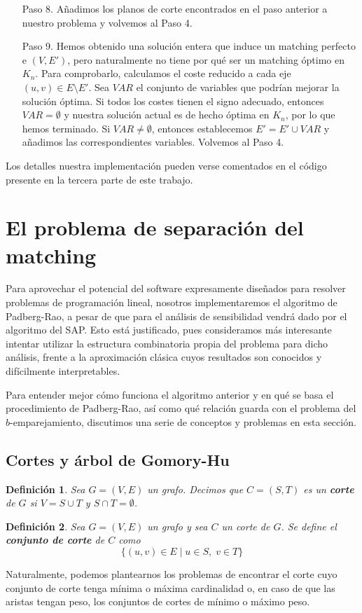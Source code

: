 \documentclass[twoside,a4paper,openright,12pt,tikz]{book}
\newtheorem{defi}{Definici\'on}[section]
\begin{document}
\begin{itemize}
\item[Paso 8.] Añadimos los planos de corte encontrados en el paso anterior a nuestro problema y volvemos al Paso 4.
\item[Paso 9.] Hemos obtenido una solución entera que induce un matching perfecto e $(V,E')$, pero naturalmente no tiene por qué ser un matching óptimo en $K_n$. Para comprobarlo, calculamos el coste reducido a cada eje $(u,v)\in E\setminus E'$. Sea $VAR$ el conjunto de variables que podrían mejorar la solución óptima. Si todos los costes tienen el signo adecuado, entonces $VAR=\emptyset$ y nuestra solución actual es de hecho óptima en $K_n$, por lo que hemos terminado. Si $VAR\neq \emptyset$, entonces establecemos $E'=E'\cup VAR$ y añadimos las correspondientes variables. Volvemos al Paso 4.
\end{itemize}
Los detalles nuestra implementación pueden verse comentados en el código presente en la tercera parte de este trabajo.
\section{El problema de separación del matching}
Para aprovechar el potencial del software expresamente diseñados para resolver problemas de programación lineal, nosotros implementaremos el algoritmo de Padberg-Rao, a pesar de que para el análisis de sensibilidad vendrá dado por el algoritmo del SAP. Esto está justificado, pues consideramos más interesante intentar utilizar la estructura combinatoria propia del problema para dicho análisis, frente a la aproximación clásica cuyos resultados son conocidos y difícilmente interpretables.

Para entender mejor cómo funciona el algoritmo anterior y en qué se basa el procedimiento de Padberg-Rao, así como qué relación guarda con el problema del $b$-emparejamiento, discutimos una serie de conceptos y problemas en esta sección.

\subsection{Cortes y árbol de Gomory-Hu} 
\begin{defi}
Sea $G = (V,E)$ un grafo. Decimos que $C=(S,T)$ es un \textbf{corte} de $G$ si $V = S \cup T$ y $S\cap T = \emptyset$.
\end{defi}
\begin{defi}
Sea $G=(V,E)$ un grafo y sea $C$ un corte de $G$. Se define el \textbf{conjunto de corte} de $C$ como
$$
\{(u,v)\in E \mid u \in S,\; v\in T\}
$$ 
\end{defi}
Naturalmente, podemos plantearnos los problemas de encontrar el corte cuyo conjunto de corte tenga mínima o máxima cardinalidad o, en caso de que las aristas tengan peso, los conjuntos de cortes de mínimo o máximo peso. 
\end{document}
